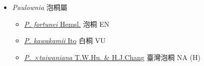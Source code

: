 
  \begin{itemize}
 \item[] \textit{Paulownia} 泡桐屬
                                
  \begin{itemize}
        \item[] \href{http://www.theplantlist.org/tpl1.1/search?q=Paulownia+fortunei}{\textit{P. fortunei} Hemsl.}   泡桐   EN
        \item[] \href{http://www.theplantlist.org/tpl1.1/search?q=Paulownia+kawakamii}{\textit{P. kawakamii} Ito}   白桐   VU
        \item[] \href{http://www.theplantlist.org/tpl1.1/search?q=Paulownia+×taiwaniana}{\textit{P. ×taiwaniana} T.W.Hu. \& H.J.Chang}   臺灣泡桐   NA (H)
  \end{itemize}
  \end{itemize}
